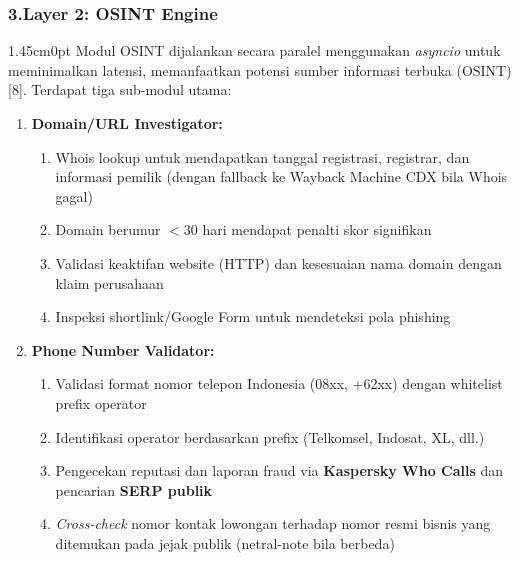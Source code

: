\documentclass[12pt,a4paper]{article}
\begin{document}
\subsubsection*{3.\quad Layer 2: OSINT Engine}

\begin{adjustwidth}{1.45cm}{0pt}
\hspace*{0.85cm}Modul OSINT dijalankan secara paralel menggunakan \textit{asyncio} untuk meminimalkan latensi, memanfaatkan potensi sumber informasi terbuka (OSINT) [8].
Terdapat tiga sub-modul utama:

\begin{enumerate}[label=\textbf{\alph*.}, labelindent=0pt, leftmargin=*]
\item \textbf{Domain/URL Investigator:}
\begin{enumerate}[label=\textbf{\arabic*)}, leftmargin=0.50cm]
\item Whois lookup untuk mendapatkan tanggal registrasi, registrar, dan informasi pemilik (dengan fallback ke Wayback Machine CDX bila Whois gagal)
\item Domain berumur $< 30$ hari mendapat penalti skor signifikan
\item Validasi keaktifan website (HTTP) dan kesesuaian nama domain dengan klaim perusahaan
\item Inspeksi shortlink/Google Form untuk mendeteksi pola phishing
\end{enumerate}

\item \textbf{Phone Number Validator:}
\begin{enumerate}[label=\textbf{\arabic*)}, leftmargin=0.50cm]
\item Validasi format nomor telepon Indonesia (08xx, +62xx) dengan whitelist prefix operator
\item Identifikasi operator berdasarkan prefix (Telkomsel, Indosat, XL, dll.)
\item Pengecekan reputasi dan laporan fraud via \textbf{Kaspersky Who Calls} dan pencarian \textbf{SERP publik}
\item \textit{Cross-check} nomor kontak lowongan terhadap nomor resmi bisnis yang ditemukan pada jejak publik (netral-note bila berbeda)
\end{enumerate}


\end{enumerate}
\end{adjustwidth}
\end{document}
